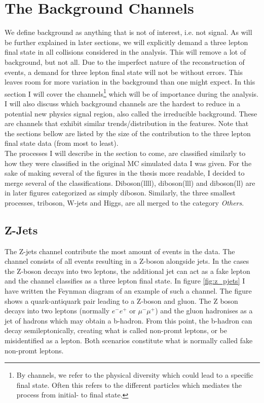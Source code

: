 \section{The Background Channels}\label{sec:bkg}
We define background as anything that is not of interest, i.e. not signal. 
As will be further explained in  later sections, we will explicitly demand a three lepton final state in all collisions 
considered in the analysis. This will remove a lot of background, but not all. Due to the imperfect nature of the 
reconstruction of events, a demand for three lepton final state will not be without errors. This leaves room for more 
variation in the background than one might expect. In this section I will cover the channels\footnote{By channels,
we refer to the physical diversity which could lead to a specific final state. Often this refers to 
the different particles which mediates the process from initial- to final state.} which will 
be of importance during the analysis. I will also discuss which background channels are the hardest 
to reduce in a potential new physics signal region, also called the irreducible background. These are 
channels that exhibit similar trends/distribution in the features. Note that the sections bellow
are listed by the size of the contribution to the three lepton final state data (from most to least).  
\\
The processes I will describe in the section to come, are classified similarly to how they were classified in the original 
\ac{MC} simulated data I was given. For the sake of making several of the figures in the thesis more readable, I decided 
to merge several of the classifications. Diboson(llll), diboson(lll) and diboson(ll) are in later figures categorized as 
simply diboson. Similarly, the three smallest processes, triboson, W-jets and Higgs, are all merged to the category
\emph{Others}.
\subsection*{Z-Jets}
The Z-jets channel contribute the most amount of events in the data. The channel consists of all events
resulting in a Z-boson alongside jets. In the cases the Z-boson decays into two leptons, the additional 
jet can act as a fake lepton and the channel classifies as a three lepton final state. In figure \ref{fig:z_pjets} 
I have written the Feynman diagram of an example of such a channel. The figure shows a quark-antiquark pair leading 
to a Z-boson and gluon. The Z boson decays into two leptons (normally $e^-e^+$ or $\mu^- \mu^+$) and the gluon hadronises 
as a jet of hadrons which may obtain a b-hadron. From this point, the b-hadron can decay semileptonically, creating what is called
non-promt leptons, or be misidentified as a lepton. Both scenarios constitute what is normally called fake non-promt leptons.

